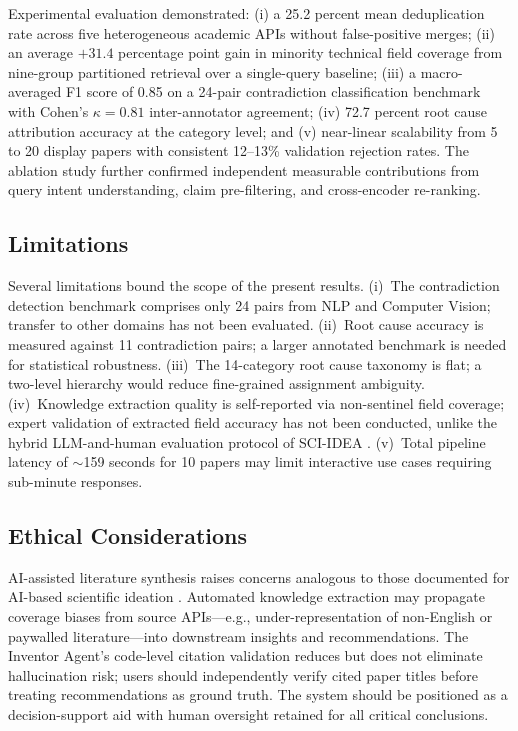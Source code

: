 \documentclass[conference]{IEEEtran}
\begin{document}
Experimental evaluation demonstrated: (i) a 25.2 percent mean deduplication
rate across five heterogeneous academic APIs without false-positive merges;
(ii) an average $+31.4$ percentage point gain in minority technical field
coverage from nine-group partitioned retrieval over a single-query baseline;
(iii) a macro-averaged F1 score of 0.85 on a 24-pair contradiction
classification benchmark with Cohen's $\kappa = 0.81$ inter-annotator
agreement; (iv) 72.7 percent root cause attribution accuracy at the
category level; and (v) near-linear scalability from 5 to 20 display papers
with consistent 12--13\% validation rejection rates. The ablation study
further confirmed independent measurable contributions from query intent
understanding, claim pre-filtering, and cross-encoder re-ranking.

\subsection*{Limitations}
Several limitations bound the scope of the present results.
(i)~The contradiction detection benchmark comprises only 24 pairs from NLP
and Computer Vision; transfer to other domains has not been evaluated.
(ii)~Root cause accuracy is measured against 11 contradiction pairs; a
larger annotated benchmark is needed for statistical robustness.
(iii)~The 14-category root cause taxonomy is flat; a two-level hierarchy
would reduce fine-grained assignment ambiguity.
(iv)~Knowledge extraction quality is self-reported via non-sentinel field
coverage; expert validation of extracted field accuracy has not been
conducted, unlike the hybrid LLM-and-human evaluation protocol of
SCI-IDEA \cite{b16}.
(v)~Total pipeline latency of $\sim$159 seconds for 10 papers may limit
interactive use cases requiring sub-minute responses.

\subsection*{Ethical Considerations}
AI-assisted literature synthesis raises concerns analogous to those
documented for AI-based scientific ideation \cite{b16}. Automated knowledge
extraction may propagate coverage biases from source APIs---e.g.,
under-representation of non-English or paywalled literature---into
downstream insights and recommendations. The Inventor Agent's code-level
citation validation reduces but does not eliminate hallucination risk;
users should independently verify cited paper titles before treating
recommendations as ground truth. The system should be positioned as a
decision-support aid with human oversight retained for all critical
conclusions.
\end{document}
